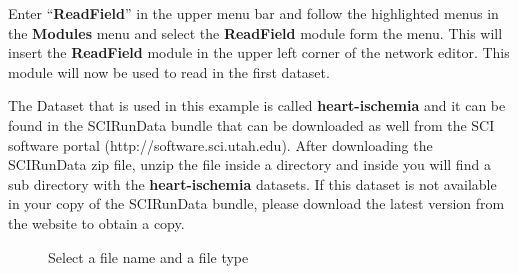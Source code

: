 \documentclass[fleqn,11pt,openany]{book}
\begin{document}
Enter \enquote{{\bf ReadField}} in the upper menu bar and follow the highlighted menus in the {\bf Modules} menu and select the {\bf ReadField} module form the menu. This will insert the {\bf ReadField} module in the upper left corner of the network editor. This module will now be used to read in the first dataset. 

The Dataset that is used in this example is called {\bf heart-ischemia} and it can be found in the SCIRunData bundle that can be downloaded as well from the SCI software portal ({http://software.sci.utah.edu}). After downloading the SCIRunData zip file, unzip the file inside a directory and inside you will find a sub directory with the {\bf heart-ischemia} datasets. If this dataset is not available in your copy of the SCIRunData bundle, please download the latest version from the website to obtain a copy.
 
\begin{figure}
\caption{Select a file name and a file type}\label{fig:ReadField}
\end{figure}
\end{document}
